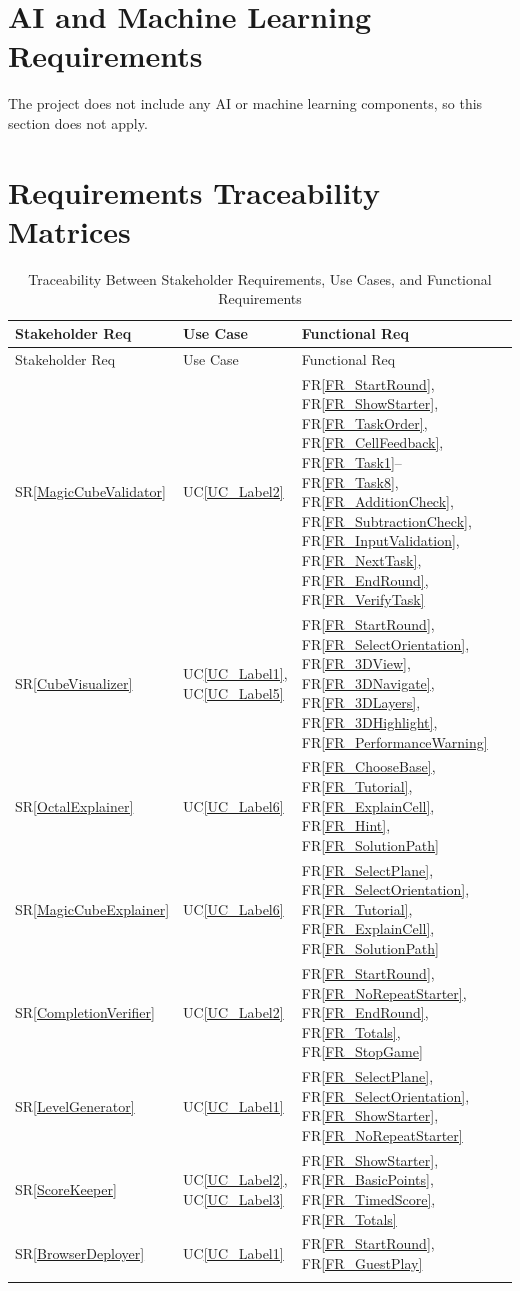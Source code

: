 \documentclass[12pt]{article}
\newcommand{\srref}[1]{SR\ref{#1}}
\newcommand{\ucref}[1]{UC\ref{#1}}
\newcommand{\rref}[1]{FR\ref{#1}}
\begin{document}
\section{AI and Machine Learning Requirements}

The project does not include any AI or machine learning components, so this section does not apply.

\section{Requirements Traceability Matrices}

\begin{longtable}{p{} p{} p{} p{}}
\toprule
Stakeholder Req & Use Case & Functional Req \\
\midrule
\endfirsthead

\toprule
Stakeholder Req & Use Case & Functional Req \\
\midrule
\endhead

\endlastfoot

\srref{MagicCubeValidator} & \ucref{UC_Label2} & \rref{FR_StartRound}, \rref{FR_ShowStarter}, \rref{FR_TaskOrder}, \rref{FR_CellFeedback}, \rref{FR_Task1}--\rref{FR_Task8}, \rref{FR_AdditionCheck}, \rref{FR_SubtractionCheck}, \rref{FR_InputValidation}, \rref{FR_NextTask}, \rref{FR_EndRound}, \rref{FR_VerifyTask} \\
\addlinespace
\srref{CubeVisualizer} & \ucref{UC_Label1}, \ucref{UC_Label5} & \rref{FR_StartRound}, \rref{FR_SelectOrientation}, \rref{FR_3DView}, \rref{FR_3DNavigate}, \rref{FR_3DLayers}, \rref{FR_3DHighlight}, \rref{FR_PerformanceWarning} \\
\addlinespace
\srref{OctalExplainer} & \ucref{UC_Label6} & \rref{FR_ChooseBase}, \rref{FR_Tutorial}, \rref{FR_ExplainCell}, \rref{FR_Hint}, \rref{FR_SolutionPath} \\
\addlinespace
\srref{MagicCubeExplainer} & \ucref{UC_Label6} & \rref{FR_SelectPlane}, \rref{FR_SelectOrientation}, \rref{FR_Tutorial}, \rref{FR_ExplainCell}, \rref{FR_SolutionPath} \\
\addlinespace
\srref{CompletionVerifier} & \ucref{UC_Label2} & \rref{FR_StartRound}, \rref{FR_NoRepeatStarter}, \rref{FR_EndRound}, \rref{FR_Totals}, \rref{FR_StopGame} \\
\addlinespace
\srref{LevelGenerator} & \ucref{UC_Label1} & \rref{FR_SelectPlane}, \rref{FR_SelectOrientation}, \rref{FR_ShowStarter}, \rref{FR_NoRepeatStarter} \\
\addlinespace
\srref{ScoreKeeper} & \ucref{UC_Label2}, \ucref{UC_Label3} & \rref{FR_ShowStarter}, \rref{FR_BasicPoints}, \rref{FR_TimedScore}, \rref{FR_Totals} \\
\addlinespace
\srref{BrowserDeployer} & \ucref{UC_Label1} & \rref{FR_StartRound}, \rref{FR_GuestPlay} \\
\bottomrule
\caption{Traceability Between Stakeholder Requirements, Use Cases, and Functional Requirements} \label{tab:SR2UC2FRtm}
\end{longtable}
\end{document}
